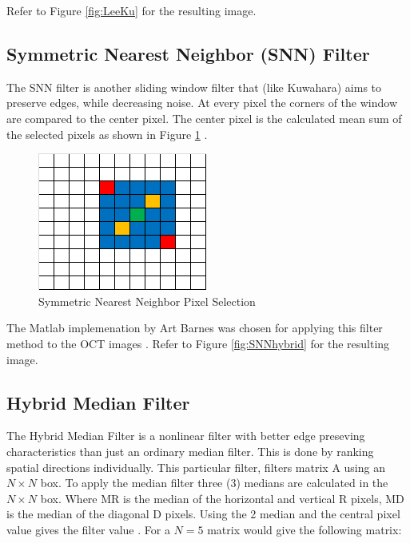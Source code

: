 \documentclass[%
reprint,
showpacs,preprintnumbers,
bibnotes,
amsmath,amssymb,
aps,
pra,
]{revtex4-1}
\begin{document}
Refer to Figure \ref{fig:LeeKu} for the resulting image.

\subsection{\label{sec:level2} Symmetric Nearest Neighbor (SNN) Filter}

The SNN filter is another sliding window filter that (like Kuwahara) aims to preserve edges, while decreasing noise. At every pixel the corners of the window are compared to the center pixel. The center pixel is the calculated mean sum of the selected pixels as shown in Figure \ref{fig:snn} \cite{fiveko_symmetric_2017}.

\begin{figure}
  \centering
  \includegraphics[width=0.8\linewidth]{Figures/snn}
  \caption{Symmetric Nearest Neighbor Pixel Selection \cite{fiveko_symmetric_2017}}
  \label{fig:snn}
\end{figure}

The Matlab implemenation by Art Barnes was chosen for applying this filter method to the OCT images \cite{barnes_snn_2005}. Refer to Figure \ref{fig:SNNhybrid} for the resulting image.
\subsection{\label{sec:level2} Hybrid Median Filter}
The Hybrid Median Filter is a nonlinear filter with better edge preseving characteristics than just an ordinary median filter. This is done by ranking spatial directions individually. This particular filter, filters matrix A using an $N \times N$ box. To apply the median filter three (3) medians are calculated in the $N \times N$ box. Where MR is the median of the horizontal and vertical R pixels, MD is the median of the diagonal D pixels. Using the 2 median and the central pixel value gives the filter value \cite{rabie_adaptive_2004}. For a $N=5$ matrix would give the following matrix:
\end{document}
